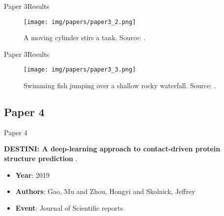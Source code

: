 \documentclass[10pt]{beamer}
\newcommand{\1}{
        	\setbeamertemplate{background}{
        		\texttt{[image: img/1]}
        		\tikz[overlay] \fill[fill opacity=0.75,fill=white] (0,0) rectangle (-\paperwidth,\paperheight);
        	}
}
\begin{document}
\begin{frame}{Paper 3}{Results}
	\begin{figure}
		\centering
		\texttt{[image: img/papers/paper3\_2.png]}
		\caption{A moving cylinder stirs a tank. Source: \cite{ando2020practical}.}
	\end{figure}
\end{frame}

\begin{frame}{Paper 3}{Results}
	\begin{figure}
		\centering
		\texttt{[image: img/papers/paper3\_3.png]}
		\caption{Swimming fish jumping over a shallow rocky waterfall. Source: \cite{ando2020practical}.}
	\end{figure}
\end{frame}


\subsection{Paper 4}

\begin{frame}{Paper 4}{}
	
	\begin{block}{}
		\centering
		\textbf{DESTINI: A deep-learning approach to contact-driven protein structure prediction} \cite{gao2019destini}.
	\end{block}
	
	\begin{itemize}
		\item \textbf{Year}: 2019
		\item \textbf{Authors}: Gao, Mu and Zhou, Hongyi and Skolnick, Jeffrey
		\item \textbf{Event}: Journal of Scientific reports
	\end{itemize}
\end{frame}
\end{document}
